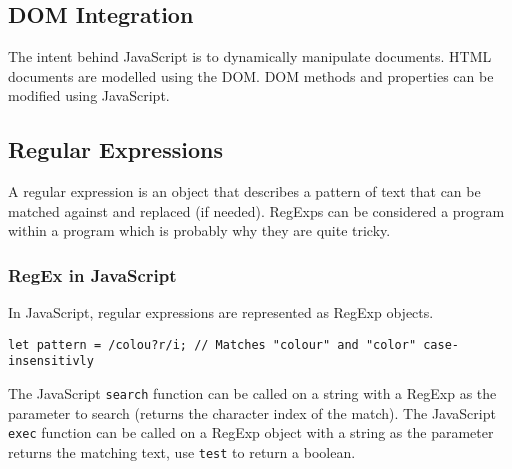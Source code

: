 \subsection{DOM Integration}\label{sub:dom_integration}

The intent behind JavaScript is to dynamically manipulate documents.
HTML documents are modelled using the DOM.
DOM methods and properties can be modified using JavaScript.

\subsection{Regular Expressions}\label{sub:regular_expressions}

A regular expression is an object that describes a pattern of text that can be matched against and replaced (if needed).
RegExps can be considered a program within a program which is probably why they are quite tricky.

\subsubsection{RegEx in JavaScript}\label{ssub:regex_in_javascript}

In JavaScript, regular expressions are represented as RegExp objects.
\begin{verbatim}
let pattern = /colou?r/i; // Matches "colour" and "color" case-insensitivly
\end{verbatim}
The JavaScript \texttt{search} function can be called on a string with a RegExp as the parameter to search (returns the character index of the match).
The JavaScript \texttt{exec} function can be called on a RegExp object with a string as the parameter returns the matching text, use \texttt{test} to return a boolean.
